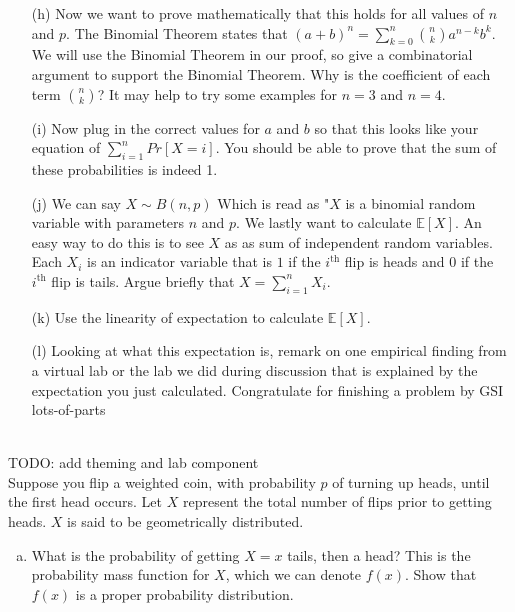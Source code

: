 \documentclass[]{article}
\begin{document}
\begin{qunlist}
\begin{enumerate}
\qpart
\item[(h)] Now we want to prove mathematically that this holds for all values of $n$ and $p$. The Binomial Theorem states that $(a+b)^n = \sum\nolimits_{k=0}^n \binom{n}{k} a^{n-k}b^k $. We will use the Binomial Theorem in our proof, so give a combinatorial argument to support the Binomial Theorem. Why is the coefficient of each term $\binom{n}{k}$? It may help to try some examples for $n=3$ and $n=4$.
\qpart
\item[(i)] Now plug in the correct values for $a$ and $b$ so that this looks like your equation of $\sum\nolimits_{i=1}^n Pr[X=i]$. You should be able to prove that the sum of these probabilities is indeed 1.
\qpart
\item[(j)] We can say $X \sim B(n,p)$ Which is read as "$X$ is a binomial random variable with parameters $n$ and $p$. We lastly want to calculate $\mathbb{E}[X]$. An easy way to do this is to see $X$ as as sum of independent random variables. Each $X_i$ is an indicator variable that is $1$ if the $i^{\text{th}}$ flip is heads and $0$ if the $i^{\text{th}}$ flip is tails. Argue briefly that $X = \sum\nolimits_{i=1}^nX_i$.
\qpart
\item[(k)] Use the linearity of expectation to calculate $\mathbb{E}[X]$.
\qpart
\item[(l)] Looking at what this expectation is, remark on one empirical finding from a virtual lab or the lab we did during discussion that is explained by the expectation you just calculated. Congratulate for finishing a problem by GSI lots-of-parts 
\end{enumerate}



 \\ TODO: add theming and lab component \\ Suppose you flip a weighted coin, with probability $p$ of turning up heads, until the first head occurs. Let $X$ represent the total number of flips prior to getting heads. $X$ is said to be geometrically distributed.

\begin{enumerate}[a)]

\qpart
\item What is the probability of getting $X=x$ tails, then a head?  This is the probability mass function for $X$, which we can denote $f(x)$.  Show that $f(x)$ is a proper probability distribution.


\end{enumerate}
\end{qunlist}
\end{document}
